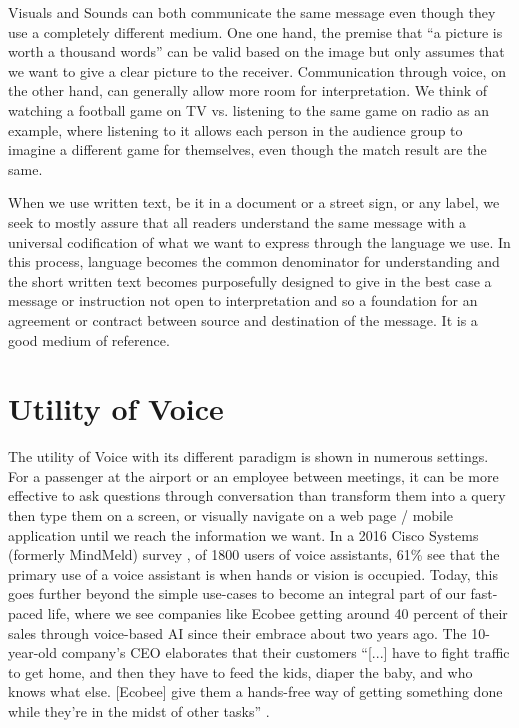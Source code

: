Visuals and Sounds can both communicate the same message even though they use a  completely different medium. One one hand, the premise that ``a picture is worth a thousand words'' can be valid based on the image but only assumes that we want to give a clear picture to the receiver. Communication through voice, on the other hand, can generally allow more room for interpretation. We think of watching a football game on TV vs. listening to the same game on radio as an example, where listening to it allows each person in the audience group to imagine a different game for themselves, even though the match result are the same.



When we use written text, be it in a document or a street sign, or any label, we seek to mostly assure that all %
readers understand the same message with a universal codification of what we want to express through the language we use. In this process, language becomes the common denominator for understanding and the short written text becomes purposefully designed to give in the best case a message or instruction not open to interpretation and so a foundation for an agreement or contract between %
source and 
destination of the message. It is a good medium of reference. 

\section{Utility of Voice}
The utility of Voice with its different paradigm is shown in numerous settings. 
For a passenger at the airport or an employee between meetings, 
it can be more effective to ask questions through conversation than transform them into a query then type them on a screen,
or visually navigate on a web page / mobile application until we reach the information we want. In a 2016 Cisco Systems (formerly MindMeld) survey \cite{mindmeldReport}, of 1800 users of voice assistants, 61\% see that the primary use of a voice assistant is when hands or vision is occupied.
Today, this goes further beyond the simple use-cases to become an integral part of our fast-paced life, where we see companies like Ecobee getting around 40 percent of their sales through voice-based AI \cite{mit:Alexa} since their embrace about two years ago. The 10-year-old company's CEO elaborates that their customers “[...] have to fight traffic to get home, and then they have to feed the kids, diaper the baby, and who knows what else. [Ecobee] give them a hands-free way of getting something done while they're in the midst of other tasks” \cite{mit:Alexa} .


